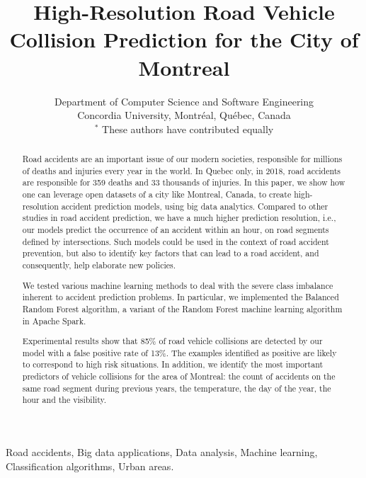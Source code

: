 \documentclass[conference]{IEEEtran}
\begin{document}
\title{High-Resolution Road Vehicle Collision Prediction for the City of Montreal}
\author{
Department of Computer Science and Software Engineering \\
Concordia University, Montréal, Québec, Canada\\
$^*$ These authors have contributed equally

}

\maketitle

\begin{abstract}

Road accidents are an important issue of our modern societies, responsible
for millions of deaths and injuries every year in the world. In Quebec only,
in 2018, road accidents are responsible for 359 deaths and 33 thousands of injuries. 
In this paper, we show how one can leverage open datasets of a city like
Montreal, Canada, to create high-resolution accident prediction models, using
big data analytics.
Compared to other studies in road accident prediction, we have a much higher
prediction resolution, i.e., our models predict the occurrence of an accident
within an hour, on road segments defined by intersections.
Such models could be used in the context of road accident prevention, but also
to identify key factors that can lead to a road accident, and consequently, help
elaborate new policies.

We tested various machine learning methods to deal with the severe class imbalance inherent
to accident prediction problems. In particular, we implemented the Balanced Random Forest algorithm, a variant
of the Random Forest machine learning algorithm in Apache Spark.

Experimental results show that 85\% of road vehicle collisions are detected by our model with a false positive rate of 13\%. The examples identified as positive are likely to correspond to high risk situations.
In addition, we identify the most important predictors of vehicle collisions for the area of Montreal: the count of accidents on the same road segment during previous years, the temperature, the day of the year, the hour and the visibility.

\end{abstract}

\begin{IEEEkeywords}
Road accidents, Big data applications, Data analysis, Machine learning, Classification algorithms, Urban areas. 
\end{IEEEkeywords}
\end{document}
